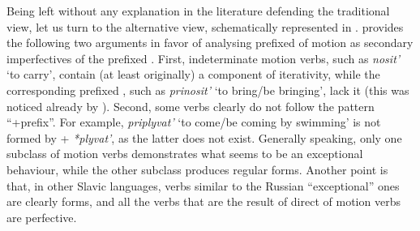 
Being left without any explanation in the literature defending the traditional view, let us turn to the alternative view, schematically represented in . \citet{Regnell:44} provides the following two arguments in favor of analysing prefixed  of motion as secondary imperfectives of the prefixed . First, indeterminate motion verbs, such as \textit{nosit'}\textsubscript{\INDET} `to carry', contain (at least originally) a component of iterativity, while the corresponding prefixed , such as \textit{prinosit'} `to bring/be bringing', lack it (this was noticed already by \citealt{Mazon:1928}). Second, some verbs clearly do not follow the pattern ``+prefix''. For example, \textit{priplyvat'} `to come/be coming by swimming' is not formed by  + \textit{*plyvat'}, as the latter does not exist. Generally speaking, only one subclass of motion verbs demonstrates what seems to be an exceptional behaviour, while the other subclass produces regular  forms. Another point is that, in other Slavic languages, verbs similar to the Russian ``exceptional'' ones are clearly  forms, and all the verbs that are the result of direct  of motion verbs are perfective.

